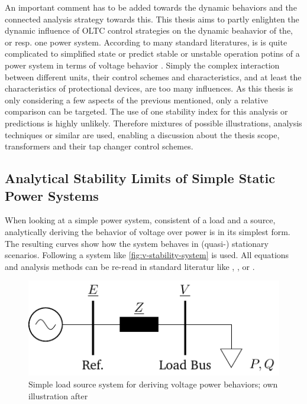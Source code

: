 An important comment has to be added towards the dynamic behaviors and the connected analysis strategy towards this.
This thesis aims to partly enlighten the dynamic influence of \acs{OLTC} control strategies on the dynamic beahavior of the, or resp. one power system.
According to many standard literatures, is is quite complicated to simplified state or predict stable or unstable operation potins of a power system in terms of voltage behavior \autocite{machowski_2020}.
Simply the complex interaction between different units, their control schemes and characteristics, and at least the characteristics of protectional devices, are too many influences.
As this thesis is only considering a few aspects of the previous mentioned, only a relative comparison can be targeted.
The use of one stability index for this analysis or predictions is highly unlikely.
Therefore mixtures of possible illustrations, analysis techniques or similar are used, enabling a discussion about the thesis scope, transformers and their tap changer control schemes.  
        
\subsection{Analytical Stability Limits of Simple Static Power Systems}
\label{sec:analytical-voltage-stability}

When looking at a simple power system, consistent of a load and a source, analytically deriving the behavior of voltage over power is in its simplest form.
The resulting curves show how the system behaves in (quasi-) stationary scenarios.
Following a system like \autoref{fig:v-stability-system} is used. 
All equations and analysis methods can be re-read in standard literatur like \textcite{machowski_2020}, \textcite{kundur_2022}, or \textcite{cutsem_1998}. 

\begin{figure}[htbp!]
    \centering
    \includegraphics{./tikz_graphics/images/analytical_model.pdf}
    \caption[Simple load source system for deriving voltage power behaviors]{Simple load source system for deriving voltage power behaviors; own illustration after \autocite{machowski_2020,kundur_2022,milano_2010}}
    \label{fig:v-stability-system}
\end{figure}

